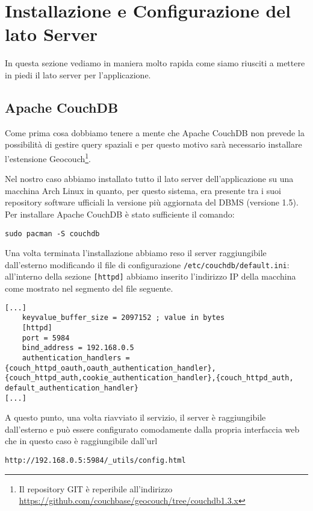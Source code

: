 \appendix
\chapter{Installazione e Configurazione del lato Server}

    In questa sezione vediamo in maniera molto rapida come siamo riusciti a
    mettere in piedi il lato server per l'applicazione.


    \section{Apache CouchDB\texttrademark{}}

        Come prima cosa dobbiamo tenere a mente che Apache
        CouchDB\texttrademark{} non prevede la possibilità di gestire query
        spaziali e per questo motivo sarà necessario installare l'estensione
        Geocouch\footnote{Il repository GIT è reperibile all'indirizzo
        \url{https://github.com/couchbase/geocouch/tree/couchdb1.3.x}}.

        Nel nostro caso abbiamo installato tutto il lato server
        dell'applicazione su una macchina Arch Linux in quanto, per questo
        sistema, era presente tra i suoi repository software ufficiali la
        versione più aggiornata del DBMS (versione 1.5). Per installare Apache
        CouchDB\texttrademark{} è stato sufficiente il comando:
        \begin{lstlisting}[language=plane]
    sudo pacman -S couchdb
        \end{lstlisting}

        Una volta terminata l'installazione abbiamo reso
        il server raggiungibile dall'esterno modificando il file di
        configurazione \texttt{/etc/couchdb/default.ini}: all'interno della
        sezione \verb|[httpd]| abbiamo inserito l'indirizzo IP della macchina
        come mostrato nel segmento del file seguente.
        \begin{lstlisting}[language=plane]
[...]
    keyvalue_buffer_size = 2097152 ; value in bytes
    [httpd]
    port = 5984
    bind_address = 192.168.0.5
    authentication_handlers = {couch_httpd_oauth,oauth_authentication_handler},{couch_httpd_auth,cookie_authentication_handler},{couch_httpd_auth, default_authentication_handler}
[...]
        \end{lstlisting}
        A questo punto, una volta riavviato il servizio, il server è
        raggiungibile dall'esterno e può essere configurato comodamente dalla
        propria interfaccia web che in questo caso è raggiungibile dall'url
        \begin{lstlisting}[language=plane]
    http://192.168.0.5:5984/_utils/config.html
        \end{lstlisting}

